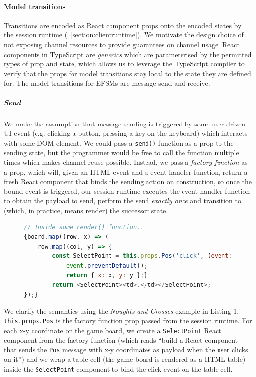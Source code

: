 \documentclass[submission,copyright,creativecommons]{eptcs}
\newcommand{\sectionref}[1]{\textsection~\ref{#1}}
\begin{document}
\paragraph{Model transitions} Transitions are encoded as React component props onto the encoded states by the session runtime (\sectionref{section:clientruntime}). We motivate the design choice of not exposing channel resources to provide guarantees on channel usage. React components in TypeScript are \textit{generics} \cite{TypeScriptSpec} which are parameterised by the permitted types of prop and state, which allows us to leverage the TypeScript compiler to verify that the props for model transitions stay local to the state they are defined for. The model transitions for EFSMs are message send and receive.

\subparagraph{Send} We make the assumption that message sending is triggered by some user-driven UI event (e.g. clicking a button, pressing a key on the keyboard) which interacts with some DOM element. We could pass a \texttt{send()} function as a prop to the sending state, but the programmer would be free to call the function multiple times which makes channel reuse possible. Instead, we pass a \textit{factory function} as a prop, which will, given an HTML event and a event handler function, return a fresh React component that binds the sending action on construction, so once the bound event is triggered, our session runtime executes the event handler function to obtain the payload to send, perform the send \textit{exactly once} and transition to (which, in practice, means render) the successor state. 

\begin{figure}[!h]
\begin{lstlisting}[language=JavaScript, tabsize=4]
// Inside some render() function..
{board.map((row, x) => (
	row.map((col, y) => {
		const SelectPoint = this.props.Pos('click', (event: UIEvent) => {
			event.preventDefault();
			return { x: x, y: y };}
		return <SelectPoint><td>.</td></SelectPoint>;
});}
\end{lstlisting}  
\label{lst:clientapp}
\end{figure}

We clarify the semantics using the \textit{Noughts and Crosses} example in Listing \ref{lst:clientapp}. \texttt{this.props.Pos} is the factory function prop passed from the session runtime. For each x-y coordinate on the game board, we create a \texttt{SelectPoint} React component from the factory function (which reads ``build a React component that sends the \texttt{Pos} message with x-y coordinates as payload when the user clicks on it'') and we wrap a table cell (the game board is rendered as a HTML table) inside the \texttt{SelectPoint} component to bind the click event on the table cell.
\end{document}

